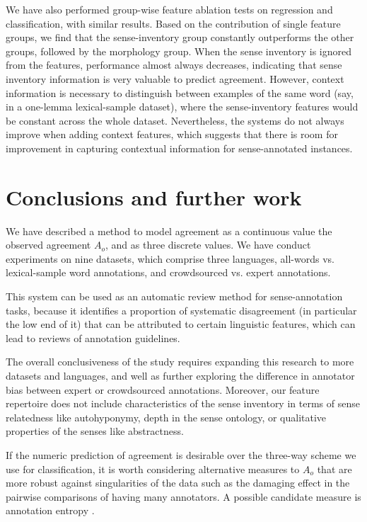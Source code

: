 \documentclass[11pt,a4paper]{article}
\begin{document}
We have also performed group-wise feature ablation tests on regression and classification, with similar results. Based on the contribution of single feature groups, we find that the sense-inventory group constantly outperforms the other groups, followed by the morphology group. When the sense inventory is ignored from the features, performance almost always decreases, indicating that sense inventory information is very valuable to predict agreement. However, context information is necessary to distinguish between examples of the same word (say, in a one-lemma lexical-sample dataset), where the sense-inventory features would be constant across the whole dataset. Nevertheless, the systems do not always improve when adding context features, which suggests that there is room for improvement in capturing contextual information for sense-annotated instances.
\section{Conclusions and further work}

We have described a method to model agreement as a continuous value  the observed agreement $A_o$, and as three discrete values. We have conduct experiments on nine datasets, which comprise three languages, all-words vs. lexical-sample word annotations, and crowdsourced vs. expert annotations. 

This system can be used as an automatic review method for sense-annotation tasks, because it identifies a proportion of systematic disagreement (in particular the low end of it) that can be attributed to certain linguistic features, which can lead to reviews of annotation guidelines. 

The overall conclusiveness of the study requires expanding this research to more datasets and languages, and well as further exploring the difference in annotator bias between expert or crowdsourced annotations. Moreover, our feature repertoire does not include characteristics of the sense inventory in terms of sense relatedness like autohyponymy, depth in the sense ontology, or qualitative properties of the senses like abstractness.

If the numeric prediction of agreement is desirable over the three-way scheme we use for classification, it is worth considering alternative measures to $A_o$ that are more robust against singularities of the data such as the damaging effect in the pairwise comparisons of having many annotators. A possible candidate measure is annotation entropy \cite{Yarowsky2002}.



\end{document}
